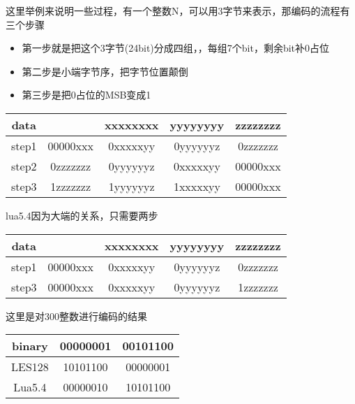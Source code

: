 这里举例来说明一些过程，有一个整数N，可以用3字节来表示，那编码的流程有三个步骤
\begin{itemize}
    \item {第一步就是把这个3字节(24bit)分成四组，，每组7个bit，剩余bit补0占位}
    \item {第二步是小端字节序，把字节位置颠倒}
    \item {第三步是把0占位的MSB变成1}
\end{itemize}
\begin{center}
    \begin{tabular}{|c|c|c|c|c|} \hline
       \hbox{data} & \hbox{} & \hbox{xxxxxxxx} & \hbox{yyyyyyyy} & \hbox{zzzzzzzz} \\ \hline
       \hbox{step1} & \hbox{00000xxx} & \hbox{0xxxxxyy} & \hbox{0yyyyyyz}  & \hbox{0zzzzzzz} \\ \hline
       \hbox{step2} & \hbox{0zzzzzzz} & \hbox{0yyyyyyz} & \hbox{0xxxxxyy}  & \hbox{00000xxx} \\ \hline
       \hbox{step3} & \hbox{1zzzzzzz} & \hbox{1yyyyyyz} & \hbox{1xxxxxyy}  & \hbox{00000xxx} \\ \hline
    \end{tabular}
\end{center}
lua5.4因为大端的关系，只需要两步
\begin{center}
    \begin{tabular}{|c|c|c|c|c|} \hline
       \hbox{data} & \hbox{} & \hbox{xxxxxxxx} & \hbox{yyyyyyyy} & \hbox{zzzzzzzz} \\ \hline
       \hbox{step1} & \hbox{00000xxx} & \hbox{0xxxxxyy} & \hbox{0yyyyyyz}  & \hbox{0zzzzzzz} \\ \hline
       \hbox{step3} & \hbox{00000xxx} & \hbox{0xxxxxyy} & \hbox{0yyyyyyz}  & \hbox{1zzzzzzz} \\ \hline
    \end{tabular}
\end{center}
这里是对300整数进行编码的结果
\begin{center}
    \begin{tabular}{|c|c|c|} \hline
       \hbox{binary} & \hbox{00000001} & \hbox{00101100} \\ \hline
       \hbox{LES128} & \hbox{10101100} & \hbox{00000001} \\ \hline
       \hbox{Lua5.4} & \hbox{00000010} & \hbox{10101100} \\ \hline
    \end{tabular}
\end{center}

